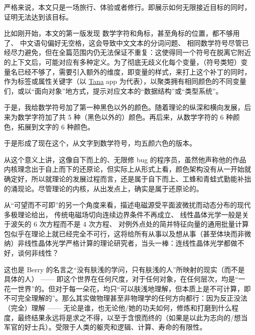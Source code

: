 严格来说，本文只是一场旅行、体验或者修行。即展示如何无限接近目标的同时，证明无法达到该目标。

比如刚开始，本文的第一版发现 {\one} 数学字符和角标，甚至角标的位置，都不够用了、{\two} 中文语句偏好无空格，这会导致中文文本的分词问题、{\three} 相同数学符号尽管已经尽力避免，但在全篇范围内仍无法保证不重复：这使得同一个符号在脱离它附近的上下文后，可能对应有多种定义。为了彻底无歧义化每个变量，（符号类短）变量名已经不够了，需要引入额外的维度，即变量的样式，来打上这个补丁的同时，作为标签或属性关键字（以 \href{https://www.tana.inc}{Tana} app 为代表），以聚类拥有相同颜色的不同变量们，或以“面向对象”地方式，提示对应文本的“数据结构”或“类型系统”。

于是，我给数学符号加了第一种黑色以外的颜色。随着理论的纵深和横向发展，后来为数学字符加了共 5 种（黑色以外的）颜色。再后来，从数学字符的 6 种颜色，拓展到文字的 6 种颜色。

于是形成了现在这个，从文字到数学符号，均五颜六色的版本。

从这个意义上讲，这像自下而上的、无限修 bug 的程序员，虽然他声称他的作品内核理念出于自上而下的还原论，但实际上从形式上看，颜色架构没有从一开始就确定好，所以就理论的发展过程而言，还是属于自下而上、工蜂和青蛙式勤能补拙的涌现论。尽管理论的内核，从出发点上，确实是属于还原论的。

从“可望而不可即”的另一个角度来看，描述电磁源受平面波微扰而动态分布的现代多极理论给出，{\one} 传统电磁场切向连续边界条件不再成立、{\two} 线性晶体光学一般是关于波矢的 6 次方程而不是 4 次方程、{\three} 对例外点处的简并特征向量的通用批量计算包似乎在理论上就已经完全不可行，这将给所有从事以及想从事（甚至体块而非微纳）非线性晶体光学严格计算的理论研究者，当头一棒：连线性晶体光学都做不好，谈何非线性？

这也是 Berry 的名言之“没有肤浅的学问，只有肤浅的人”所映射的现实（而不是具体的人） ------ 即这个世界在任何尺度，对于任何对象，在任何层次，均是“一花一世界”的。但对于每一朵花，均只“可以肤浅地理解，但本质上是不可计算，即不可完全理解的”。那么其实做物理甚至非物理学的任何方向都行：因为反正没法（完全）理解 ------ 无论是谁，也无论他/她的功夫如何，修炼和打磨到什么程度，最终结果永远将是求之不得，以至于含恨而终的（如果是以此为志向的/想当军官的好士兵）。受限于人类的躯壳和逻辑、计算、寿命的有限性。

